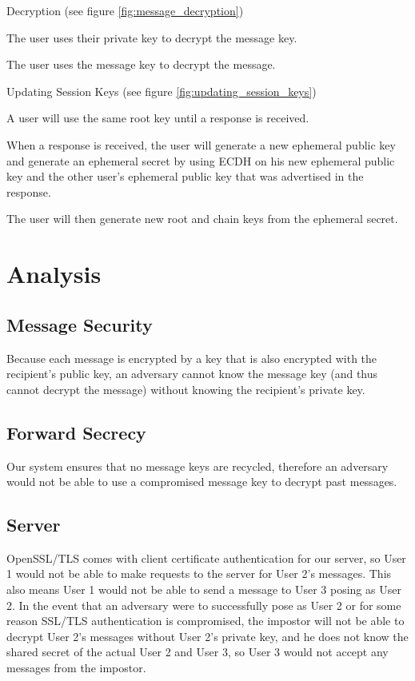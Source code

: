 \documentclass[12pt]{article}
\begin{document}
\begin{outline}[enumerate]
	\2 Decryption (see figure \ref{fig:message_decryption})

		\3 The user uses their private key to decrypt the message key.

		\3 The user uses the message key to decrypt the message.

\1 Updating Session Keys (see figure \ref{fig:updating_session_keys})

	\2 A user will use the same root key until a response is received.

	\2 When a response is received, the user will generate a new ephemeral
	public key and generate an ephemeral secret by using ECDH on his new
	ephemeral public key and the other user’s ephemeral public key that was
	advertised in the response.

	\2 The user will then generate new root and chain keys from the
	ephemeral secret.
\end{outline}




\section{Analysis}

\subsection{Message Security}
Because each message is encrypted by a key that is also encrypted with the
recipient’s public key, an adversary cannot know the message key (and thus
cannot decrypt the message) without knowing the recipient’s private key.

\subsection{Forward Secrecy}
Our system ensures that no message keys are recycled, therefore an adversary
would not be able to use a compromised message key to decrypt past messages.

\subsection{Server}

OpenSSL/TLS comes with client certificate authentication for our server, so
User 1 would not be able to make requests to the server for User 2's messages.
This also means User 1 would not be able to send a message to User 3 posing as
User 2. In the event that an adversary were to successfully pose as User 2 or
for some reason SSL/TLS authentication is compromised, the impostor will not be
able to decrypt User 2's messages without User 2's private key, and he does not
know the shared secret of the actual User 2 and User 3, so User 3 would not
accept any messages from the impostor.
\end{document}
